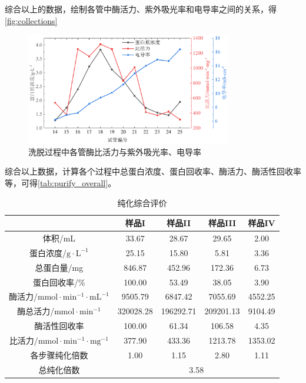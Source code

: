 综合以上的数据，绘制各管中酶活力、紫外吸光率和电导率之间的关系，得\autoref{fig:collections}
\begin{figure}[H]
    \centering
    \includegraphics[width = 0.8\textwidth]{figure/curves/pro_activity_conduct.pdf}
    \caption{洗脱过程中各管酶比活力与紫外吸光率、电导率}
    \label{fig:collections}
\end{figure}

综合以上数据，计算各个过程中总蛋白浓度、蛋白回收率、酶活力、酶活性回收率等，可得\autoref{tab:purify_overall}。

\begin{table}[H]
\centering
\caption{纯化综合评价}
\label{tab:purify_overall}
\begin{tabular}{@{}ccccc@{}}
\toprule
             & 样品I       & 样品II       & 样品III       & 样品IV     \\ \midrule
体积/mL        & 33.67     & 28.67     & 29.65     & 2.00    \\
蛋白浓度/$\mathrm{g\cdot L^{-1}}$ & 25.15     & 15.80     & 5.81      & 3.36    \\
总蛋白量/mg      & 846.87    & 452.96    & 172.36    & 6.73    \\
蛋白回收率/\%     & 100.00    & 53.49     & 38.05     & 3.90    \\
酶活力/$\mathrm{mmol\cdot min^{-1} \cdot mL^{-1}}$     & 9505.79   & 6847.42   & 7055.69   & 4552.25 \\
酶总活力/$\mathrm{mmol\cdot min^{-1}}$      & 320028.28 & 196292.71 & 209201.13 & 9104.49 \\
酶活性回收率       & 100.00    & 61.34     & 106.58    & 4.35    \\
比活力/$\mathrm{mmol\cdot min^{-1} \cdot mg^{-1}}$    & 377.90    & 433.36    & 1213.78   & 1353.02 \\
各步骤纯化倍数      & 1.00      & 1.15      & 2.80      & 1.11    \\
总纯化倍数        & \multicolumn{4}{c}{3.58}                    \\ \bottomrule
\end{tabular}
\end{table}

